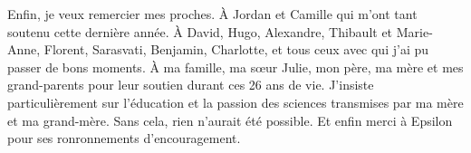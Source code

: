 Enfin, je veux remercier mes proches. À Jordan et Camille qui m'ont tant soutenu cette dernière
année. À David, Hugo, Alexandre, Thibault et Marie-Anne, Florent, Sarasvati, Benjamin, Charlotte,
et tous ceux avec qui j'ai pu passer de bons moments. À ma famille, ma sœur Julie, mon père, ma
mère et mes grand-parents pour leur soutien durant ces 26 ans de vie. J'insiste particulièrement
sur l'éducation et la passion des sciences transmises par ma mère et ma grand-mère. Sans cela, rien
n'aurait été possible. Et enfin merci à Epsilon pour ses ronronnements d'encouragement.


